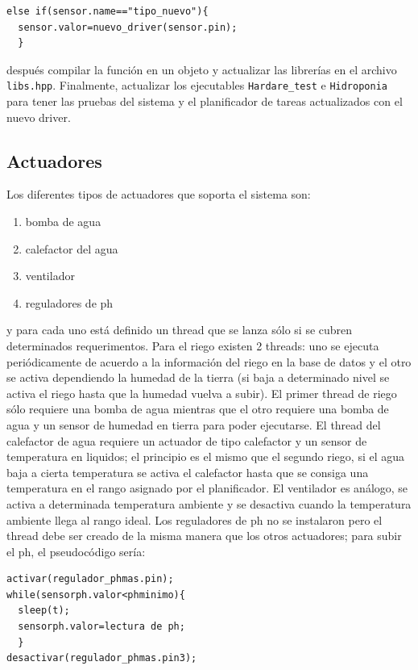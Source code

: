 \documentclass[a4paper,10pt,titlepage]{article}
\begin{document}
\begin{verbatim}
else if(sensor.name=="tipo_nuevo"){
  sensor.valor=nuevo_driver(sensor.pin);
  }
\end{verbatim}

despu\'es compilar la funci\'on en un objeto y actualizar las librer\'ias en el archivo \verb|libs.hpp|. Finalmente, actualizar los ejecutables \verb|Hardare_test| e 
\verb|Hidroponia| para tener las pruebas del sistema y el planificador de tareas actualizados con el nuevo driver.

\subsection{Actuadores}
Los diferentes tipos de actuadores que soporta el sistema son:
\begin{enumerate}
	\item bomba de agua
	\item calefactor del agua
	\item ventilador
	\item reguladores de ph
\end{enumerate}
y para cada uno est\'a definido un thread que se lanza s\'olo si se cubren determinados requerimentos. Para el riego existen 2 threads: uno se ejecuta 
peri\'odicamente 
de acuerdo a la informaci\'on del riego en la 
base de datos y el otro se activa dependiendo la humedad de la tierra (si baja a determinado nivel se activa el riego hasta que la humedad vuelva a subir). El primer thread 
de riego s\'olo 
requiere una bomba de agua mientras que el otro requiere una bomba de agua y un sensor de humedad en tierra para poder ejecutarse. El thread del calefactor de agua requiere 
un actuador de tipo calefactor y un sensor de temperatura en liquidos; el principio es el mismo que el segundo riego, si el agua baja a cierta temperatura se activa el 
calefactor 
hasta que se consiga una temperatura en el rango asignado por el planificador. El ventilador es an\'alogo, se activa a determinada temperatura ambiente y se desactiva 
cuando la temperatura ambiente llega al rango ideal. Los reguladores de ph no se instalaron pero el thread debe ser creado de la misma manera que los otros 
actuadores; para subir el ph, el pseudoc\'odigo ser\'ia:

\begin{verbatim}
activar(regulador_phmas.pin);
while(sensorph.valor<phminimo){
  sleep(t);
  sensorph.valor=lectura de ph;
  }
desactivar(regulador_phmas.pin3);
\end{verbatim}
\end{document}
